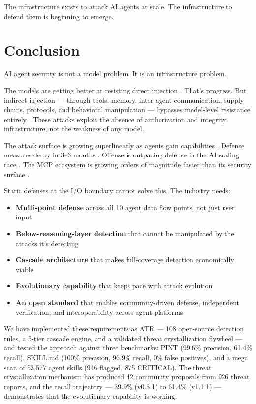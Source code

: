 \documentclass[11pt,letterpaper]{article}
\begin{document}
The infrastructure exists to attack AI agents at scale. The infrastructure to defend them is beginning to emerge.


\section{Conclusion}
\label{sec:conclusion}

AI agent security is not a model problem. It is an infrastructure problem.

The models are getting better at resisting direct injection \cite{grayswan,anthropicrates}. That's progress. But indirect injection --- through tools, memory, inter-agent communication, supply chains, protocols, and behavioral manipulation --- bypasses model-level resistance entirely \cite{minja,invariant,sandworm,cve6514}. These attacks exploit the absence of authorization and integrity infrastructure, not the weakness of any model.

The attack surface is growing superlinearly as agents gain capabilities \cite{kim2026}. Defense measures decay in 3--6 months \cite{anthropicrates,checkmarx}. Offense is outpacing defense in the AI scaling race \cite{aisafety}. The MCP ecosystem is growing orders of magnitude faster than its security surface \cite{gartner,checkmarx}.

Static defenses at the I/O boundary cannot solve this. The industry needs:

\begin{itemize}
\item \textbf{Multi-point defense} across all 10 agent data flow points, not just user input
\item \textbf{Below-reasoning-layer detection} that cannot be manipulated by the attacks it's detecting
\item \textbf{Cascade architecture} that makes full-coverage detection economically viable
\item \textbf{Evolutionary capability} that keeps pace with attack evolution
\item \textbf{An open standard} that enables community-driven defense, independent verification, and interoperability across agent platforms
\end{itemize}

We have implemented these requirements as ATR \cite{atr} --- 108 open-source detection rules, a 5-tier cascade engine, and a validated threat crystallization flywheel --- and tested the approach against three benchmarks: PINT \cite{pint} (99.6\% precision, 61.4\% recall), SKILL.md (100\% precision, 96.9\% recall, 0\% false positives), and a mega scan of 53,577 agent skills \cite{atrscanmega} (946 flagged, 875 CRITICAL). The threat crystallization mechanism has produced 42 community proposals from 926 threat reports, and the recall trajectory --- 39.9\% (v0.3.1) to 61.4\% (v1.1.1) --- demonstrates that the evolutionary capability is working.
\end{document}
